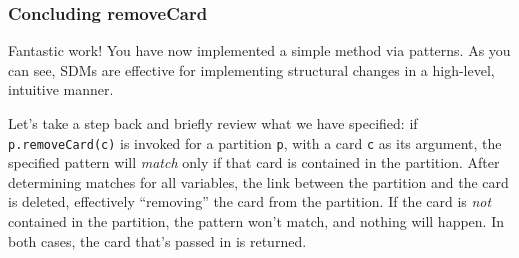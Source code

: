 \genHeader
\hypertarget{remCard end}{}
\subsubsection{Concluding removeCard}

Fantastic work! You have now implemented a simple method via patterns. As you can see, SDMs are effective for implementing structural changes in a high-level,
intuitive manner.

Let's take a step back and briefly review what we have specified:  if \texttt{p.remove\-Card(c)} is invoked for a partition \texttt{p}, with a card \texttt{c}
as its argument, the specified pattern will \emph{match} only if that card is contained in the partition. After determining matches for all variables, the
link between the partition and the card is deleted, effectively ``removing'' the card from the partition. If the card is \emph{not} contained in the partition,
the pattern won't match, and nothing will happen. In both cases, the card that's passed in is returned.

